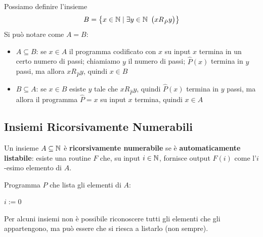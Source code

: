Possiamo definire l'insieme
$$ B = \left\{x \in \N \mid \exists y \in \N \ \left(xR_{\hat{P}}y\right)\right\} $$
Si può notare come $A = B$:
\begin{itemize}
	\item $A \subseteq B$: se $x \in A$ il programma codificato con $x$ su input $x$ termina in un certo numero di passi; chiamiamo $y$ il numero di passi; $\hat{P}(x)$ termina in $y$ passi, ma allora $xR_{\hat{P}} y$, quindi $x \in B$
	\item $B \subseteq A$: se $x \in B$ esiste $y$ tale che $xR_{\hat{P}}y$, quindi $\hat{P}(x)$ termina in $y$ passi, ma allora il programma $\hat{P} = x$ su input $x$ termina, quindi $x \in A$
\end{itemize}

\subsection{Insiemi Ricorsivamente Numerabili}

Un insieme $A \subseteq \mathbb{N}$ è \textbf{ricorsivamente numerabile} se è \textbf{automaticamente listabile}: esiste una routine $F$ che, su input $i \in \mathbb{N}$, fornisce output $F(i)$ come l'$i$-esimo elemento di $A$.

Programma $P$ che lista gli elementi di $A$:

\vspace{0.5em}
\hspace{4em}
\begin{minipage}{.3\textwidth}
	\begin{tcolorbox}[
		colback=white,
		sharp corners,
		boxrule=.3mm,
		left=20pt
		]
		\begin{algorithm}[H]
			\SetAlgoNoEnd
			$i:=0$ \\
		\end{algorithm}
	\end{tcolorbox}
\end{minipage}
\hspace{2em}
\begin{minipage}{.55\textwidth}
	Per alcuni insiemi non è possibile riconoscere tutti gli elementi che gli appartengono, ma può essere che si riesca a listarlo (non sempre).
\end{minipage}
\vspace{0.1em}

